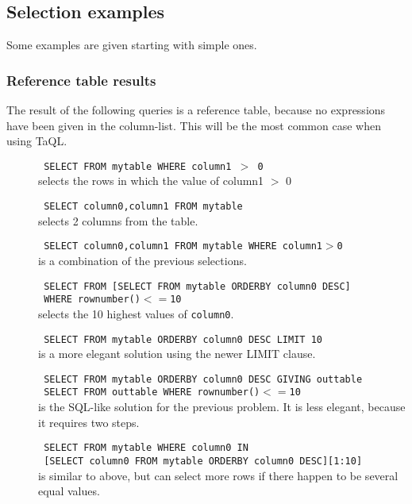 \subsection{\label{TAQL:SELEXAMPLES}Selection examples}
Some examples are given starting with simple ones.
\subsubsection{Reference table results}
The result of the following queries is a reference table, because no
expressions have been given in the column-list. This will be the most
common case when using TaQL.
\begin{description}
  \item[] \texttt{ SELECT FROM mytable WHERE column1 $>$ 0 }
    \\selects the rows in which the value of column1 $>$ 0

  \item[] \texttt{ SELECT column0,column1 FROM mytable }
    \\selects 2 columns from the table.

  \item[] \texttt{ SELECT column0,column1 FROM mytable WHERE column1$>$0 }
    \\is a combination of the previous selections.

  \item[] \texttt{ SELECT FROM [SELECT FROM mytable ORDERBY column0 DESC] }
    \\\texttt{ WHERE rownumber()$<=$10 }
    \\selects the 10 highest values of \texttt{column0}.

  \item[] \texttt{ SELECT FROM mytable ORDERBY column0 DESC LIMIT 10 }
    \\is a more elegant solution using the newer LIMIT clause.

  \item[] \texttt{ SELECT FROM mytable ORDERBY column0 DESC GIVING outtable }
    \\\texttt{ SELECT FROM outtable WHERE rownumber()$<=$10 }
    \\is the SQL-like solution for the previous problem.
    It is less elegant, because it requires two steps.

  \item[] \texttt{ SELECT FROM mytable WHERE column0 IN }
    \\\texttt{ [SELECT column0 FROM mytable ORDERBY column0 DESC][1:10] }
    \\is similar to above, but can select more rows if there happen
    to be several equal values.


\end{description}
